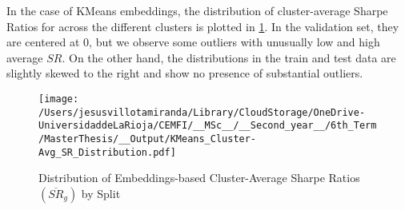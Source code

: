 %
%
%
%

In the case of KMeans embeddings, the distribution of cluster-average Sharpe Ratios for across the different clusters is plotted in \cref{fig:KMeans_distr_avg_SR}. In the validation set, they are centered at 0, but we observe some outliers with unusually low and high average $SR$. On the other hand, the distributions in the train and test data are slightly skewed to the right and show no presence of substantial outliers.

\begin{figure}[H]
  \centering
  \caption{Distribution of Embeddings-based Cluster-Average Sharpe Ratios $(\overline{SR}_g)$ by Split}
  \texttt{[image: /Users/jesusvillotamiranda/Library/CloudStorage/OneDrive-UniversidaddeLaRioja/CEMFI/\_\_MSc\_\_/\_\_Second\_year\_\_/6th\_Term/MasterThesis/\_\_Output/KMeans\_Cluster-Avg\_SR\_Distribution.pdf]}
\label{fig:KMeans_distr_avg_SR}

\end{figure}


